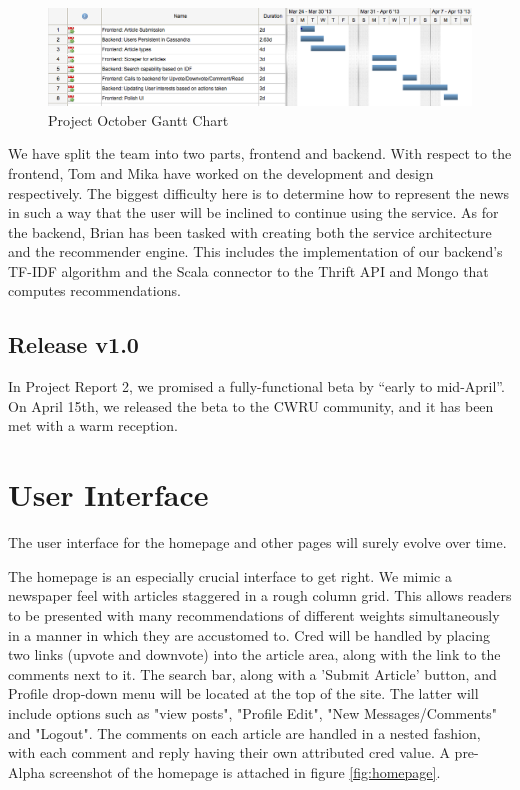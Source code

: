 \documentclass[11pt,letterpaper]{article}
\begin{document}
\begin{figure}
\centering
\includegraphics[scale=0.45]{img/octoborg-gantt.png}
\caption{Project October Gantt Chart}
\label{fig:gantt}
\end{figure}

We have split the team into two parts, frontend and backend.
With respect to the frontend, Tom and Mika have worked on the development and design respectively.
The biggest difficulty here is to determine how to represent the news in such a way that the user will be inclined to continue using the service.
As for the backend, Brian has been tasked with creating both the service architecture and the recommender engine.
This includes the implementation of our backend's TF-IDF algorithm and the Scala connector to the Thrift API and Mongo that computes recommendations.

\subsection{Release v1.0}
In Project Report 2, we promised a fully-functional beta by ``early to mid-April''.
On April 15th, we released the beta to the CWRU community, and it has been met with a warm reception.

\section{User Interface}
The user interface for the homepage and other pages will surely evolve over time.

The homepage is an especially crucial interface to get right. We mimic a newspaper feel with articles staggered in a rough column grid.
This allows readers to be presented with many recommendations of different weights simultaneously in a manner in which they are accustomed to. 
Cred will be handled by placing two links (upvote and downvote) into the article area, along with the link to the comments next to it. 
The search bar, along with a 'Submit Article' button, and Profile drop-down menu will be located at the top of the site. The latter will include options such as "view posts", "Profile Edit", "New Messages/Comments" and "Logout".
The comments on each article are handled in a nested fashion, with each comment and reply having their own attributed cred value. 
A pre-Alpha screenshot of the homepage is attached in figure \ref{fig:homepage}.
\end{document}
